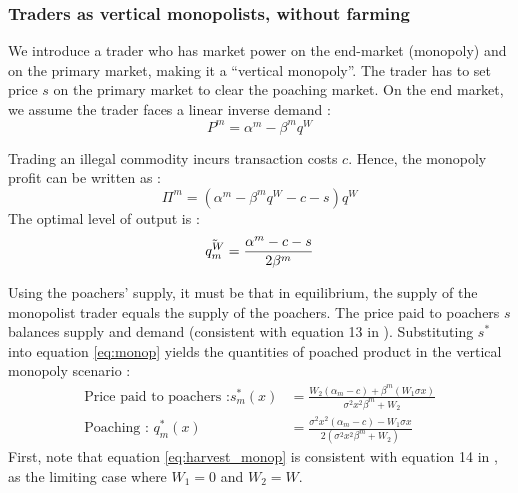 \subsubsection{Traders as vertical monopolists, without farming}
We introduce a trader who has market power on the end-market (monopoly) and on the primary market, making it a \enquote{vertical monopoly}. The trader has to set price $s$ on the primary market to clear the poaching market. On the end market, we assume the trader faces a linear inverse demand : 
\begin{equation}
    P^m = \alpha^m - \beta^m q^W
\label{eq:inv_demand_monop}
\end{equation}

Trading an illegal commodity incurs transaction costs $c$. Hence, the monopoly profit can be written as : 
\begin{equation}
    \Pi^m = (\alpha^m - \beta^mq^W - c -s )q^W
    \label{eq:profit_monop}
\end{equation}
The optimal level of output is : 
\begin{equation}
    \Tilde{q_m^W}=\frac{\alpha^m - c - s}{2\beta^m}
    \label{eq:monop}
\end{equation}

Using the poachers' supply, it must be that in equilibrium, the supply of the monopolist trader equals the supply of the poachers. The price paid to poachers $s$ balances supply and demand (consistent with equation 13 in \cite{damania_economics_2007}). Substituting $s^*$ into equation \ref{eq:monop} yields the quantities of poached product in the vertical monopoly scenario : 
\begin{align}
    \text{Price paid to poachers :} s^*_m(x) &= \frac{W_2 (\alpha_m -c) + \beta^m (W_1 \sigma x) }{ \sigma^2 x^2 \beta^m + W_2 }\\
        \text{Poaching : } q^*_m(x) &=\frac{\sigma^2 x^2 (\alpha_m - c) - W_1 \sigma x}{2(\sigma^2 x^2 \beta^m +W_2)}
    \label{eq:harvest_monop}
\end{align}
First, note that equation \ref{eq:harvest_monop} is consistent with equation 14 in \cite{damania_economics_2007}, as the limiting case where $W_1= 0$ and $W_2 = W$. 
 
